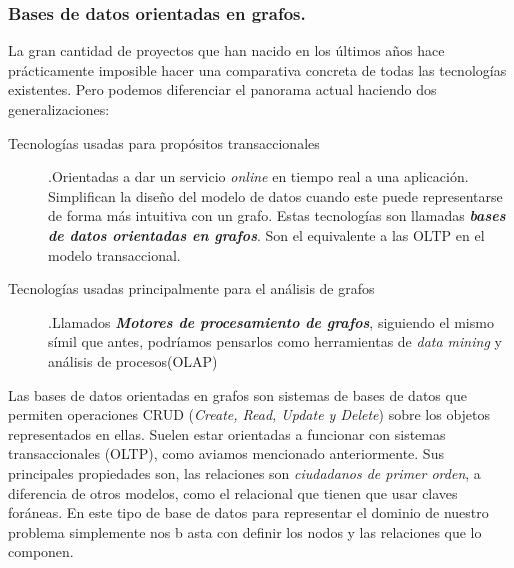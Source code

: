 \documentclass[12pt]{article} %
\begin{document}
\subsubsection{Bases de datos orientadas en grafos.}
La gran cantidad de proyectos que han nacido en los últimos años hace prácticamente imposible hacer una comparativa concreta de todas las tecnologías existentes. Pero podemos diferenciar el panorama actual haciendo dos generalizaciones:
\begin{description}
\item[Tecnologías usadas para propósitos transaccionales].\linebreak Orientadas a dar un servicio \textit{online} en tiempo real a una aplicación. Simplifican la diseño del modelo de datos cuando este puede representarse de forma más intuitiva con un grafo. 
\linebreak Estas tecnologías son llamadas \textbf\textit{bases de datos orientadas en grafos}. Son el equivalente a las OLTP en el modelo transaccional.


\noindent{}

\item[Tecnologías usadas principalmente para el análisis de grafos].\linebreak Llamados \textbf\textit{Motores de procesamiento de grafos}, siguiendo el mismo símil que antes, podríamos pensarlos como herramientas de \textit{data mining} y análisis de procesos(OLAP)
\end{description}

Las bases de datos orientadas en grafos son sistemas de bases de datos que permiten operaciones CRUD (\textit{Create, Read, Update y Delete}) sobre los objetos representados en ellas. Suelen estar orientadas a funcionar con sistemas transaccionales (OLTP), como aviamos mencionado anteriormente. Sus principales propiedades son, las relaciones son \textit{ciudadanos de primer orden}, a diferencia de otros modelos, como el relacional que tienen que usar claves foráneas. En este tipo de base de datos para representar el dominio de nuestro problema simplemente nos b
asta con definir los nodos y las relaciones que lo componen.
\end{document}
